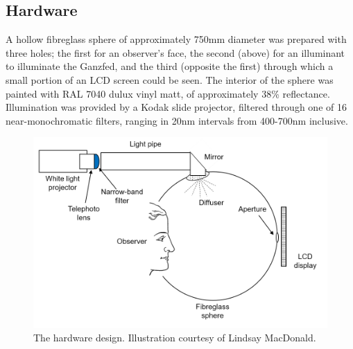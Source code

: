 \subsection{Hardware}

A hollow fibreglass sphere of approximately 750mm diameter was prepared with three holes; the first for an observer's face, the second (above) for an illuminant to illuminate the Ganzfed, and the third (opposite the first) through which a small portion of an LCD screen could be seen. The interior of the sphere was painted with RAL 7040 dulux vinyl matt, of approximately 38\% reflectance. Illumination was provided by a Kodak slide projector, filtered through one of 16 near-monochromatic filters, ranging in 20nm intervals from 400-700nm inclusive.

\begin{figure}[htbp]
\includegraphics[max width=\textwidth]{figs/LargeSphere/sketch.png}
\caption{The hardware design. Illustration courtesy of Lindsay MacDonald.}
\label{fig:sketch}
\end{figure}


